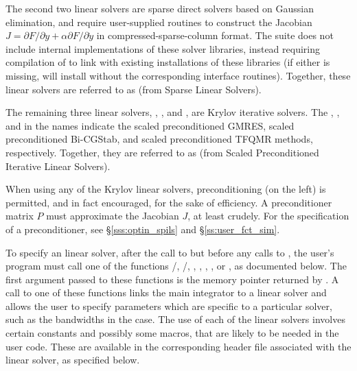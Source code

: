 The second two linear solvers are sparse direct solvers based on
Gaussian elimination, and require user-supplied routines to construct
the Jacobian $J = \partial{F}/\partial{y} + \alpha
\partial{F}/\partial{\dot{y}}$ in compressed-sparse-column format. The
{\sundials} suite does not include internal implementations of these
solver libraries, instead requiring compilation of {\sundials} to link
with existing installations of these libraries (if either is missing,
{\sundials} will install without the corresponding interface
routines).  Together, these linear solvers are referred to as
{\idasls} (from Sparse Linear Solvers).


The remaining three {\ida} linear solvers, {\idaspgmr}, {\idaspbcg},
and {\idasptfqmr}, are Krylov iterative solvers. The {\spgmr}, {\spbcg}, and
{\sptfqmr} in the names indicate the scaled preconditioned GMRES, scaled
preconditioned Bi-CGStab, and scaled preconditioned TFQMR methods, respectively.
Together, they are referred to as {\idaspils} (from Scaled Preconditioned 
Iterative Linear Solvers).

When using any of the Krylov linear solvers, preconditioning (on the left)
is permitted, and in fact encouraged, for the sake of efficiency.
A preconditioner matrix $P$ must approximate the Jacobian $J$, at least
crudely.  For the specification of a preconditioner, see \S\ref{sss:optin_spils}
and \S\ref{ss:user_fct_sim}.

To specify an {\ida} linear solver, after the call to  but
before any calls to , the user's program must call one of the
functions /, /,
, , , , or
, as documented below.  
The first argument passed to these functions
is the {\ida} memory pointer returned by .  A call to one of these
functions links the main {\ida} integrator to a linear solver and
allows the user to specify parameters which are specific to a
particular solver, such as the bandwidths in the {\idaband} case.
The use of each of the linear solvers involves certain constants and possibly 
some macros, that are likely to be needed in the user code.  These are
available in the corresponding header file associated with the linear
solver, as specified below.

